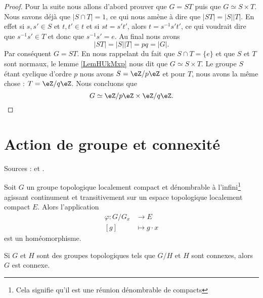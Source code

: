 \begin{proof}
    Pour la suite nous allons d'abord prouver que \( G=ST\) puis que \( G\simeq S\times T\). Nous savons déjà que \( | S\cap T |=1\), ce qui nous amène à dire que \( | ST |=| S | |T |\). En effet si \( s,s'\in S\) et \( t,t'\in t\) et si \( st=s't'\), alors \( t=s^{-1}s't'\), ce qui voudrait dire que \( s^{-1}s'\in T\) et donc que \( s^{-1}s'=e\). Au final nous avons
    \begin{equation}
        | ST |=| S | |T |=pq=| G |.
    \end{equation}
    Par conséquent \( G=ST\). En nous rappelant du fait que \( S\cap T=\{ e \}\) et que \( S\) et \( T\) sont normaux, le lemme \ref{LemHUkMxp} nous dit que \( G\simeq S\times T\). Le groupe \( S\) étant cyclique d'ordre \( p\) nous avons \( S=\eZ/p\eZ\) et pour \( T\), nous avons la même chose : \( T=\eZ/q\eZ\). Nous concluons que
    \begin{equation}
        G\simeq \eZ/p\eZ\times \eZ/q\eZ.
    \end{equation}
\end{proof}
 

\section{Action de groupe et connexité}

Sources : \cite{MneimneLie} et .

\begin{theorem}     \label{ThojrLKZk}
    Soit \( G\) un groupe topologique localement compact et dénombrable à l'infini\footnote{Cela signifie qu'il est une réunion dénombrable de compacts} agissant continument et transitivement sur un espace topologique localement compact \( E\). Alors l'application
    \begin{equation}
        \begin{aligned}
            \varphi\colon G/G_x&\to E \\
            [g]&\mapsto g\cdot x 
        \end{aligned}
    \end{equation}
    est un homéomorphisme.
\end{theorem}

\begin{lemma}       \label{LemkLRAet}
    Si \( G\) et \( H\) sont des groupes topologiques tels que $G/H$ et \( H\) sont connexes, alors \( G\) est connexe.
\end{lemma}

